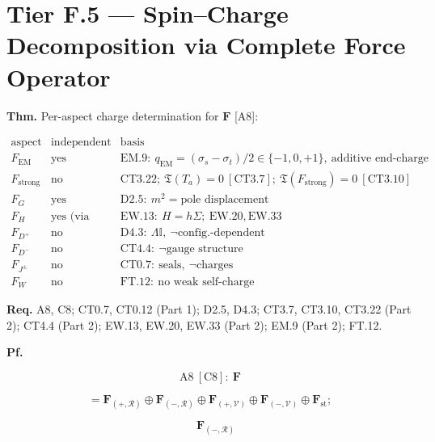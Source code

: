 \section[Tier F.5 — Spin–Charge Decomposition via Complete Force…]{\texorpdfstring{Tier F.5 — Spin–Charge Decomposition via Complete Force Operator}{Tier F.5 - Spin-Charge Decomposition via Complete Force Operator}}

\begin{theorem}\label{tag:FT-11}
\textbf{Thm.} Per-aspect charge determination for $\mathbf F$ [A8]:

\[
\begin{array}{c|c|c}
\text{aspect} & \text{independent charge?} & \text{basis}\\ \hline
F_{\mathrm{EM}} & \text{yes} & \mathrm{EM.9}:\ q_{\mathrm{EM}}=(\sigma_s-\sigma_t)/2\in\{-1,0,+1\},\ \text{additive end-charge}\\
F_{\mathrm{strong}} & \text{no (confined)} & \mathrm{CT3.22};\ \mathfrak T(T_a)=0\ [\mathrm{CT3.7}];\ \mathfrak T(F_{\mathrm{strong}})=0\ [\mathrm{CT3.10}]\\
F_G & \text{yes} & \mathrm{D2.5}:\ m^2=\text{pole displacement}\\
F_H & \text{yes (via mass)} & \mathrm{EW.13}:\ H=h\Sigma;\ \mathrm{EW.20},\mathrm{EW.33}\\
F_{D^+} & \text{no} & \mathrm{D4.3}:\ \Lambda\mathbb I,\ \neg\text{config.-dependent}\\
F_{D^-} & \text{no} & \mathrm{CT4.4}:\ \neg\text{gauge structure}\\
F_{J^\pm} & \text{no} & \mathrm{CT0.7}:\ \text{seals},\ \neg\text{charges}\\
F_W & \text{no} & \mathrm{FT.12}:\ \text{no weak self-charge}
\end{array}
\]

\textbf{Req.} A8, C8; CT0.7, CT0.12 (Part 1); D2.5, D4.3; CT3.7, CT3.10, CT3.22 (Part 2); CT4.4 (Part 2); EW.13, EW.20, EW.33 (Part 2); EM.9 (Part 2); FT.12.

\textbf{Pf.}

\[
\mathrm{A8}\ [\mathrm{C8}]:\ \mathbf F
\]

\[
= \mathbf F_{(+,\mathcal R)}\oplus\mathbf F_{(-,\mathcal R)}\oplus\mathbf F_{(+,\mathcal V)}\oplus\mathbf F_{(-,\mathcal V)}\oplus\mathbf F_{\mathrm{st}};
\]

\[
\quad\mathbf F_{(-,\mathcal R)}
\]


\end{theorem}
